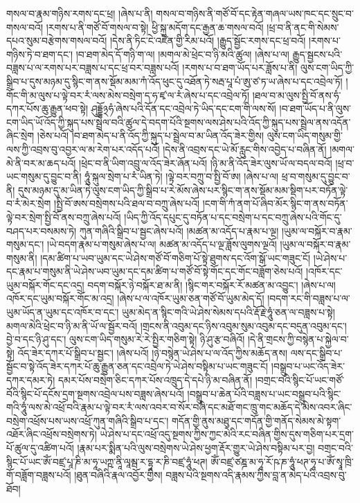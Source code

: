 གསལ་བ་རྣམ་གཉིས་རགས་དང་ཕྲ། །ཞེས་པ་ནི། གསལ་བ་གཉིས་ནི་གཙོ་བོ་དང་རྟེན་གཞལ་ཡས་ཁང་དང་སྲུང་བ་གསལ་བའོ། །རགས་པ་ནི་གཙོ་བོ་གསལ་བ་སྟེ། ཕྱི་སྐུ་མདོག་དང་རྒྱན་ཆ་གསལ་བའོ། །ཕྲ་བ་ནི་ནང་གི་སེམས་དཔའ་སུམ་བརྩེགས་གསལ་བའོ། །དེས་ནི་ཏིང་ངེ་འཛིན་གྱི་རིམ་པའོ། །རྒྱུད་སྦྱོང་རགས་དང་ཕྲ་བའོ། །རགས་པ་གཉིས་ཏེ་བ་ཐག་དང་། །བ་ཐག་མེད་དོ་གཉི་ག་ལ། །མགལ་མེ་ཕྲེང་བ་ཉི་མའི་ཚུལ། །ཞེས་པ་ལ། རྒྱུད་སྦྱངས་པའི་བཟླས་པ་ལ་རགས་པར་བཟླས་པ་དང་ཕྲ་བར་བཟླས་པའོ། །རགས་པ་བ་ཐག་ཡོད་པར་ཟློས་པ་ནི། ལུས་ངག་ཡིད་ཀྱི་སྒྲིབ་པ་དུས་མཉམ་དུ་སྙིང་ག་ནས་སྡོམ་མམ་ཀཾ་འོད་ཕུང་དུ་འཐོན་ཏེ་སརྦ་པཱ་པཾ་ཨུ་ཙ་ཏ་ཡ་ཞེས་པ་དང་འབྲེལ་ཏོ། །གོང་གི་མ་ལུས་པ་ལྟེ་བར་རཾ་ལས་མེས་བསྲེག་ད་ཧ་ཛྭ་ལ་རཾ་ཞེས་པ་དང་འབྲེལ་ཏོ། །ཐལ་བ་མ་ལུས་སྤྱི་བོ་ནས་ཧཾ་དཀར་པོས་ཆུ་རྒྱུན་ཕབ་སྟེ། ཤུདྡྷོ྅ཧཾ་ཞེས་པའི་དོན་དང་འབྲེལ་ཏེ་ཡིད་དང་ངག་གི་ལས་སོ། །བ་ཐག་ཡོད་པ་ནི་ལུས་ངག་ཡིད་ཡོ་འོད་ཀྱི་སྐུད་པས་སྦྲེལ་བའི་ཚུལ་དེ་བདག་པོའི་སྔགས་ལས་ཤེས་པའི་འོད་ཀྱི་སྐུད་པས་སྦྲེལ་ནས་འདོན་ཞིང་སྲེག །ཅེས་པའོ། །བ་ཐག་མེད་པ་ནི་འོད་ཀྱི་སྐུད་པ་སྦྲེལ་བ་མ་ཡིན་འོད་ཟེར་གྱིས། ལུས་ངག་ཡིད་གསུམ་གྱི་ལས་ཀྱི་འབྲས་བུ་འབྱར་ལ་མ་རེག་པར་འདོད་པའོ། །དེས་ནི་འབྲས་དང་ཡེ་མོ་རླུང་གིས་འབྱེད་པ་བཞིན་ནོ། །མགལ་མེ་ནི་བར་མ་ཆད་པའོ། །ཕྲེང་བ་ནི་ཡིག་འབྲུ་ལ་འོད་ཟེར་ཞོན་པའོ། །ཉི་མ་ནི་འོད་ཟེར་ལུས་ཡོ་ལ་བདལ་བའོ། །ཕྲ་བ་ཡང་གསུམ་དུ་བྱུང་བ་ནི། ཧཱུཾ་སྐུལ་སྲེག་པ་རཾ་ཡིན་ཏེ། །ལྟེ་བར་བཀྲུ་བ་སྤྱི་བོ་ཨ། །ཞེས་པ་ལ། ཕྲ་བ་གསུམ་དུ་བྱུང་བ་ནི། དུས་མཉམ་དུ་མ་ཡིན་ཏེ་ལུས་ངག་ཡིད་ཀྱི་སྒྲིབ་པ་རེ་མོས་ཞེས་པར་སྙིང་ག་ནས་སྡོམ་མམ་སྡིག་པར་བཏོན་ལྟེ་བ་རཾ་མེར་སྲེག །སྤྱི་བོ་ཨས་བསྲེགས་པའི་ཐལ་བ་བཀྲུ་ཞེས་པའོ། །ངག་གི་ཀཾ་ནག་པོ་ཞིབ་མོར་སྙིང་ག་ནས་བཏོན་ལྟེ་བར་སྲེག་སྤྱི་བོ་ནས་བཀྲུ་ཞེས་པའོ། །ཡིད་ཀྱི་འོད་དཔུང་དུ་བཏོན་པ་དང་བསྲེག་པ་དང་བཀྲུ་ཞེས་པའི་གོང་དུ་བཤད་པར་བསམས་ཏེ། ཀུན་གཞིའི་སྒྲིབ་པ་སྦྱང་ཞེས་པའོ། །མཚན་མ་འདོད་པ་རྣམ་པ་ལྔ། །ཡུམ་ལ་བསྐོར་བ་རྣམ་གསུམ་དང་། །ཡེ་བདག་རྣམ་པ་གསུམ་ཞེས་པ་ལ། མཚན་མ་འདོད་པ་ལྔ་ཟློས་ལུགས་ལྔའོ། །ཡུམ་ལ་བསྐོར་བ་རྣམ་གསུམ་ནི། །དམ་ཚིག་པ་ཡབ་ཡུམ་དང་ཡེ་ཤེས་གཙོ་བོ་གཅིག་པོ་སྟེ་ཐུགས་དང་འོག་སྒོ་ཡང་གཟུང་ངོ། །ཡེ་ཤེས་པ་དང་རྣམ་པ་གསུམ་ནི་ཡེ་ཤེས་ཡབ་ཡུམ་དང་དམ་ཚིག་པ་གཙོ་བོ་སྟེ་གོང་དང་གོང་བཟློག་ཅེས་པའོ། །འཁོར་དང་ཡུམ་བསྐོར་གོང་དང་འདྲ། བདག་བསྐོར་ཉེ་བསྐོར་ཐ་མ་ནི། །སྙིང་གར་བསྐོར་རོ་མཚན་མ་འབྱུང་། །ཞེས་པ་ལ། འཁོར་དང་ཡུམ་བསྐོར་གོང་མ་འདྲ། །ཞེས་པ་ལ་འཁོར་ཡུམ་ཅན་གཙོ་བོ་ཡུམ་མེད་དོ། །བདག་རང་གི་བཟླས་པ་ལ་ཡུམ་ཡོད་ན་ཡུམ་དང་འཁོར་བ་དང་། ཡུམ་མེད་ན་སྙིང་གའི་ཡེ་ཤེས་སེམས་དཔའི་རྡོ་རྗེ་ཧཱུཾ་ཅན་ལ་བཟླས་པ་སྟེ། མགལ་མེའི་ཕྲེང་བ་ཉི་མ་ནི་ཡོ་ལ་སྦྱོར་བའོ། །གྲངས་ནི་འབུམ་དང་ཉིས་འབུམ་སུམ་འབུམ་དང་བདུན་འབུམ་དང་། བྱེ་བ་དང་ཉི་ཤུ་དང་། ལུས་ངག་ཡིད་གསུམ་རེ་རེ་སྤྱིར་གཅིག་སྟེ། ཉི་ཤུ་རྩ་བཞིའོ། །དེ་ནི་གྲངས་ཀྱི་བསྙེན་པ་སྐྱེལ་བ་སྟེ། འོད་ཟེར་དཀར་པོ་སྒྲིབ་པ་སྦྱང་། །ཞེས་པའོ། །ཉེ་བསྙེན་ཡེ་ཤེས་པ་ལ་འོད་ཀྱིས་མཆོད་ནས། ལས་དང་སྒྲིབ་པ་སྦྱོང་བ་སྟེ་འོད་ཟེར་དཀར་པོ་ཆུ་རྒྱུན་ཅན་དང་འབྲེལ་ཏེ་ཡེ་ཤེས་བསྟིམ་པ་ཡང་གཟུང་ངོ། །བསྒྲུབ་པ་ཡང་འོད་ཟེར་དཀར་དམར་ཏེ། དམར་པོས་བསྲེག་ཅིང་དཀར་པོས་འཁྲུད་དེ་དཔེ་ཉི་མ་བཞིན་ནོ། །བགྲང་བའི་སྙིང་པོ་ཡང་གཙོ་བོའི་སྙིང་པོ་དངོས་དྲག་སྔགས་འབྲེལ་པས་བཟླས་ཞེས་པའོ། །བསྒྲུབ་པ་ཆེན་པོའི་བཟླས་པ་ཡང་བསྒྲུབ་པའི་སྙིང་གའི་ཧཱུཾ་ལས་མེ་འཕྲོ་བའི་རྣམ་པ་ལྟེ་བར་རཾ་ལས་འབར་བ་སོར་བཞི་དང་མཐོ་གང་ཁྲུ་གང་མཆོད་དེ་མེས་འབར་ཞིང་བསྲེག་འཕྲོས་པས་ཡས་འཕྲོ་ཀུན་གཞིའི་སྒྲིབ་པ་དང་། གདོན་གྱི་ནུས་མཐུ་དང་གདོན་གྱི་གནོད་སེམས་མེ་སྟག་འཐོར་ཞིང་འཕྲོས་བསྲེགས་ཏེ། ཡེ་ཤེས་པ་དང་འཕྲོ་འདུ་སྔགས་ཀྱིས་ཀྱང་མེའི་རང་བཞིན་གྱིས་དུས་གཅིག་པར་དྲག་པོ་ཚུལ་དུ་འཚིག་པའོ། །རྣམ་པར་སྨིན་པའི་ལུས་བསྲེགས་ཡེ་ཤེས་ཕྱག་རྡོར་གྱུར་ཡེ་ཤེས་བསྟིམ་པར་བྱ། བགྲང་བའི་སྙིང་པོ་ཡང་ཨོཾ་བཛྲ་པཱ་ཎི་མ་ཧཱ་ཡཀྵ་ནཱི་ལཱམྦ་ར་དྷཱ་ར་ཎི་བཛྲ་ཧཱུཾ་ཕཊ། ཨོཾ་བཛྲ་ཙཎྜ་མ་ཧཱ་རོ་ཥ་ཎ་ཧཱུཾ་ཕཊ་ཧཱ་པ་ཨོཾ་སྭཱ་ཁྲི་གོ་བཟློག་བཟླས་པའོ། །ཐུན་བཞིའི་རྣལ་འབྱོར་གྱིས། བཟླས་པའི་སྔགས་འདི་རྣམས་ཀྱིས་བླ་ན་མེད་པའི་འབྲས་བུ་ཐོབ། 